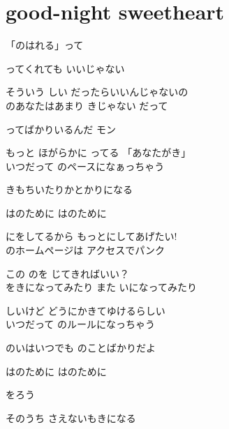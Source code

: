 \section{ good-night sweetheart}
\large{

「のはれる」って

ってくれても いいじゃない

そういう しい だったらいいんじゃないの
\\

のあなたはあまり きじゃない だって

ってばかりいるんだ モン

もっと ほがらかに ってる 「あなたがき」
\\

いつだって のペースになぁっちゃう

きもちいたりかとかりになる

はのために はのために

にをしてるから もっとにしてあげたい!
\\

のホームページは アクセスでパンク

この のを じてきればいい？
\\

をきになってみたり また いになってみたり

しいけど どうにかきてゆけるらしい
\\

いつだって のルールになっちゃう

のいはいつでも のことばかりだよ

はのために はのために

をろう 

そのうち さえないもきになる
\\

}
